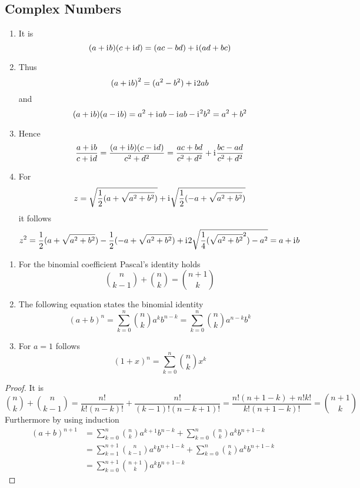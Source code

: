 \subsection{Complex Numbers}

\begin{lemma}\hfill
    \begin{enumerate}
        \item It is
            \[
                (a + \mathrm{i}\mkern1mu b) (c + \mathrm{i}\mkern1mu d) = (ac - bd) + \mathrm{i}\mkern1mu (ad + bc)
            \]
        \item Thus
            \[
               {(a + \mathrm{i}\mkern1mu b)}^2 = (a^2 - b^2) + \mathrm{i}\mkern1mu 2ab
            \]
            and
            \[
                (a + \mathrm{i}\mkern1mu b) (a - \mathrm{i}\mkern1mu b) =  a^2 + \mathrm{i}\mkern1mu ab - \mathrm{i}\mkern1mu ab - \mathrm{i}\mkern1mu^2b^2 = a^2 + b^2
            \]
        \item Hence
            \[
                \frac{a + \mathrm{i}\mkern1mu b}{c + \mathrm{i}\mkern1mu d} = \frac{(a + \mathrm{i}\mkern1mu b)(c - \mathrm{i}\mkern1mu d)}{c^2 + d^2} = 
                    \frac{ac + bd}{c^2 + d^2} + \mathrm{i}\mkern1mu \frac{bc - ad}{c^2 + d^2}
            \]
        \item For 
            \[
                z = \sqrt{\frac{1}{2}(a + \sqrt{a^2 + b^2})} + \mathrm{i}\mkern1mu \sqrt{\frac{1}{2}(-a + \sqrt{a^2 + b^2})} 
            \]
            it follows
            \[
                z^2 = \frac{1}{2}(a + \sqrt{a^2 + b^2}) - \frac{1}{2}(-a + \sqrt{a^2 + b^2}) +
                    \mathrm{i}\mkern1mu 2\sqrt{\frac{1}{4} (\sqrt{a^2 + b^2}^2) - a^2} = a + \mathrm{i}\mkern1mu b
            \]
    \end{enumerate}
\end{lemma}
\bigskip


\begin{lemma}\hfill
    \begin{enumerate}
        \item For the binomial coefficient Pascal's identity holds
			\[
				\binom{n}{k - 1} + \binom{n}{k} = \binom{n + 1 }{k }   
			\]  
        \item The following equation states the binomial identity
			\[
				{(a + b)}^n = \sum_{k=0}^{n} \binom{n}{k} a^{k} b^{n - k} = \sum_{k=0}^{n} \binom{n}{k} a^{n -k} b^{k}
			\]  
        \item For \( a = 1 \) follows
			\[
				{(1 + x)}^n = \sum_{k=0}^{n} \binom{n}{k} x^{k}
			\]  
    \end{enumerate}
\end{lemma}

\begin{proof}
It is
\[
	\binom{n}{k} + \binom{n}{k - 1} = \frac{n!}{k!(n - k)!} + \frac{n!}{(k - 1)!(n - k + 1)!}
		= \frac{n!(n + 1 - k) + n!k!}{k!(n + 1- k)!} = \binom{n + 1}{k}
\]
Furthermore by using induction
\[
    \begin{split}
		{(a + b)}^{n + 1}	& = \sum_{k=0}^{n} \binom{n}{k} a^{k + 1} b^{n - k} + 
								\sum_{k=0}^{n} \binom{n}{k} a^{k} b^{n + 1 - k} \\
							& = \sum_{k=1}^{n + 1} \binom{n}{k - 1} a^{k} b^{n + 1 - k} + 
								\sum_{k=0}^{n} \binom{n}{k} a^{k} b^{n + 1 - k} \\
							& = \sum_{k=0}^{n + 1} \binom{n + 1}{k} a^{k} b^{n + 1 - k}
    \end{split}
\]  
\end{proof}
\bigskip


